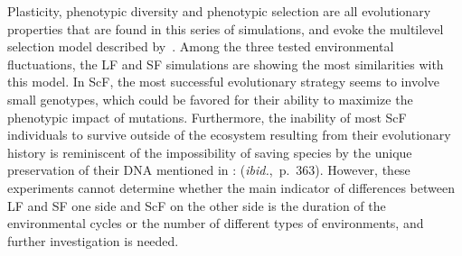 

Plasticity, phenotypic diversity and phenotypic selection are all evolutionary properties that are found in this series of simulations, and evoke the multilevel selection model described by~\citet{jablonka2014evolution}. Among the three tested environmental fluctuations, the LF and SF simulations are showing the most similarities with this model. In ScF, the most successful evolutionary strategy seems to involve small genotypes, which could be favored for their ability to maximize the phenotypic impact of mutations. Furthermore, the inability of most ScF individuals to survive outside of the ecosystem resulting from their evolutionary history is reminiscent of the impossibility of saving species by the unique preservation of their DNA mentioned in \cite{jablonka2014evolution}:  (\emph{ibid.},~p.~363). However, these experiments cannot determine whether the main indicator of differences between LF and SF one side and ScF on the other side is the duration of the environmental cycles or the number of different types of environments, and further investigation is needed.



